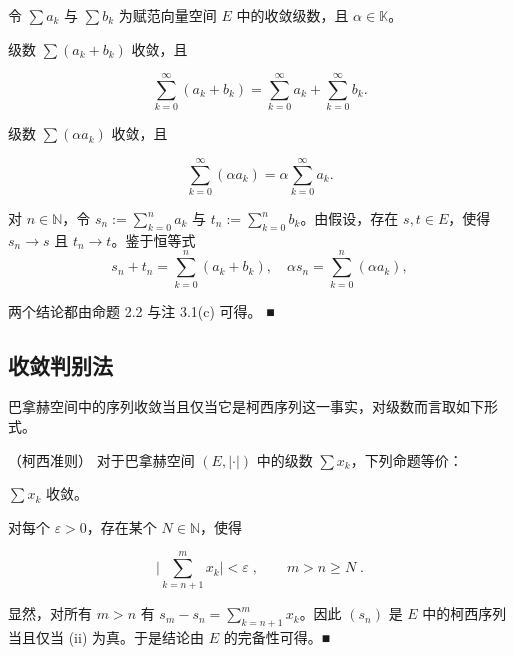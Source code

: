 \begin{proposition}

令 $ \sum a_k $ 与 $ \sum b_k $ 为赋范向量空间 $ E $ 中的收敛级数，且 $ \alpha \in \mathbb{K} $。

\begin{subitems}
\item

级数 $ \sum(a_k + b_k) $ 收敛，且

\[
\sum_{k=0}^{\infty}(a_{k}+b_{k})=\sum_{k=0}^{\infty}a_{k}+\sum_{k=0}^{\infty}b_{k}.
\]
\item

级数 $ \sum(\alpha a_k) $ 收敛，且

\[
\sum_{k=0}^{\infty}(\alpha a_{k})=\alpha\sum_{k=0}^{\infty}a_{k}.
\]

\proofhead
对 $ n \in \mathbb{N} $，令 $ s_n := \sum_{k=0}^{n} a_k $ 与 $ t_n := \sum_{k=0}^{n} b_k $。由假设，存在 $ s, t \in E $，使得 $ s_n \to s $ 且 $ t_n \to t $。鉴于恒等式
\[
s_{n}+t_{n}=\sum_{k=0}^{n}(a_{k}+b_{k}),\quad\alpha s_{n}=\sum_{k=0}^{n}(\alpha a_{k}),
\]

两个结论都由命题 2.2 与注 3.1(c) 可得。 ■

\end{subitems}

\end{proposition}

\subsection*{收敛判别法}

巴拿赫空间中的序列收敛当且仅当它是柯西序列这一事实，对级数而言取如下形式。

\begin{theorem}

（柯西准则） 对于巴拿赫空间 $ (E, |\cdot|) $ 中的级数 $ \sum x_k $，下列命题等价：

\begin{subitems}
\item

$ \sum x_{k} $ 收敛。

\item

对每个 $ \varepsilon > 0 $，存在某个 $ N \in \mathbb{N} $，使得

\[
\Big|\sum_{k=n+1}^{m}x_{k}\Big|<\varepsilon\;,\qquad m>n\geq N\;.
\]

\proofhead
显然，对所有 $m > n$ 有 $s_m - s_n = \sum_{k=n+1}^m x_k$。因此 $(s_n)$ 是 $E$ 中的柯西序列当且仅当 (ii) 为真。于是结论由 $E$ 的完备性可得。■
\end{subitems}

\end{theorem}

